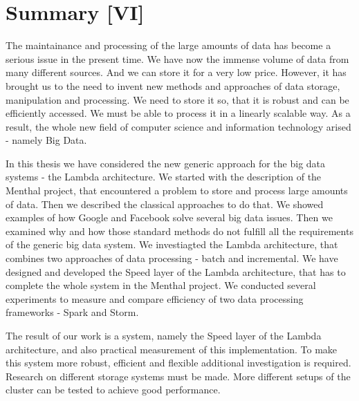 \chapter{Summary [VI]}
\label{chap:summary}

The maintainance and processing of the large amounts of data has become a serious issue in the present time.
We have now the immense volume of data from many different sources.
And we can store it for a very low price.
However, it has brought us to the need to invent new methods and approaches of data storage, manipulation and processing.
We need to store it so, that it is robust and can be efficiently accessed.
We must be able to process it in a linearly scalable way.
As a result, the whole new field of computer science and information technology arised - namely Big Data.

In this thesis we have considered the new generic approach for the big data systems - the Lambda architecture.
We started with the description of the Menthal project, that encountered a problem to store and process large amounts of data.
Then we described the classical approaches to do that.
We showed examples of how Google and Facebook solve several big data issues.
Then we examined why and how those standard methods do not fulfill all the requirements of the generic big data system.
We investiagted the Lambda architecture, that combines two approaches of data processing - batch and incremental.
We have designed and developed the Speed layer of the Lambda architecture, that has to complete the whole system in the Menthal project.
We conducted several experiments to measure and compare efficiency of two data processing frameworks - Spark and Storm.

The result of our work is a system, namely the Speed layer of the Lambda architecture, and also practical measurement of this implementation.
To make this system more robust, efficient and flexible additional investigation is required.
Research on different storage systems must be made.
More different setups of the cluster can be tested to achieve good performance.